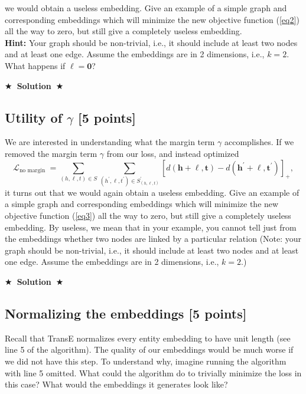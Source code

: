 \documentclass{article}
\numberwithin{figure}{section}
\newcommand{\Solution}[1]{%
    {%
        \medskip
        \color{red}
        \bf $\bigstar$~\sf\textbf{Solution}~$\bigstar$ \sf
        #1
    }
    \bigskip
}
\begin{document}
we would obtain a useless embedding. Give an example of a simple graph and corresponding embeddings which will minimize the new objective function (\ref{eq2}) all the way to zero, but still give a completely useless embedding.\\
\textbf{Hint:} Your graph should be non-trivial, i.e., it should include at least two nodes and at least one edge. Assume the embeddings are in 2 dimensions, i.e., $k = 2$.
What happens if $\boldsymbol{\ell} = \textbf{0}$?

\Solution{}

\subsection{Utility of $\gamma$  [5 points]}
We are interested in understanding what the margin term $\gamma$ accomplishes. If we removed the margin term $\gamma$ from our loss, and instead optimized
\begin{equation}\tag{9}\label{eq3}
\mathcal{L}_{\text {no margin }}=\sum_{(h, \ell, t) \in S} \sum_{\left(h^{\prime}, \ell, t^{\prime}\right) \in S_{(h, \ell, t)}^{\prime}}\left[d(\mathbf{h}+\boldsymbol{\ell}, \mathbf{t})-d\left(\mathbf{h}^{\prime}+\boldsymbol{\ell}, \mathbf{t}^{\prime}\right)\right]_{+},
\end{equation}
it turns out that we would again obtain a useless embedding. Give an example of a simple graph and corresponding embeddings which will minimize the new objective function (\ref{eq3}) all the way to zero, but still give a completely useless embedding. By useless, we mean that in your example, you cannot tell just from the embeddings whether two nodes are linked by a particular relation (Note: your graph should be non-trivial, i.e., it should include at least two nodes and at least one edge. Assume the embeddings are in 2 dimensions, i.e., $k=2$.)

\Solution{}

\subsection{ Normalizing the embeddings [5 points]}
Recall that TransE normalizes every entity embedding to have unit length (see line 5 of the algorithm). The quality of our embeddings would be much worse if we did not have this step. To understand why, imagine running the algorithm with line 5 omitted. What could the algorithm do to trivially minimize the loss in this case? What would the embeddings it generates look like?
\end{document}
